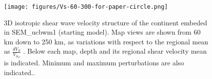 \documentclass[12pt]{article}
\begin{document}

				



	\begin{figure}
		\centering
		\texttt{[image: figures/Vs-60-300-for-paper-circle.png]}

		\caption{\baselineskip 18pt
		3D isotropic shear wave velocity structure of the continent embeded in SEM\_ucbwm1 (starting model). Map views are shown from 60 km down to 250 km, as variations with respect to the regional mean as $\frac{dV_S}{V_{S_{O}}}$ . 
		Below each map, depth and its regional shear velocity mean is indicated. Minimum and maximum perturbations are also indicated..
		}

		\label{Vs-circle}

	\end{figure}


\end{document}
